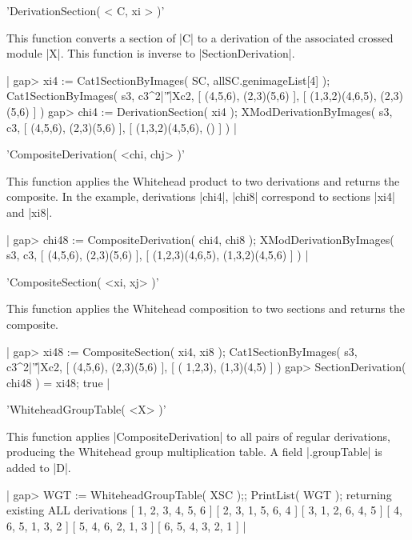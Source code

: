 %

'DerivationSection( < C, xi > )'

This  function  converts a  section   of |C| to   a derivation  of the
associated   crossed  module    |X|.  This function    is   inverse to
|SectionDerivation|.

|    gap> xi4 := Cat1SectionByImages( SC, allSC.genimageList[4] );
    Cat1SectionByImages( s3, c3^2|'\|'|Xc2, [ (4,5,6), (2,3)(5,6) ], 
       [ (1,3,2)(4,6,5), (2,3)(5,6) ] )
    gap> chi4 := DerivationSection( xi4 );
    XModDerivationByImages( s3, c3, [ (4,5,6), (2,3)(5,6) ],
       [ (1,3,2)(4,5,6), () ] )  |

%

'CompositeDerivation( <chi, chj> )'

This function  applies the  Whitehead product  to  two derivations and
returns the  composite.   In the  example,  derivations |chi4|, |chi8|
correspond to sections |xi4| and |xi8|.

|    gap> chi48 := CompositeDerivation( chi4, chi8 );
    XModDerivationByImages( s3, c3, [ (4,5,6), (2,3)(5,6) ], 
       [ (1,2,3)(4,6,5), (1,3,2)(4,5,6) ] )  |

%

'CompositeSection( <xi, xj> )'

This function  applies the Whitehead  composition to  two sections and
returns the composite.

|    gap> xi48 := CompositeSection( xi4, xi8 );
    Cat1SectionByImages( s3, c3^2|'\|'|Xc2, [ (4,5,6), (2,3)(5,6) ], 
       [ ( 1,2,3), (1,3)(4,5) ] )
    gap> SectionDerivation( chi48 ) = xi48;
    true  |

%

'WhiteheadGroupTable( <X> )'

This  function applies |CompositeDerivation|   to all pairs of regular
derivations,  producing the Whitehead  group  multiplication table.  A
field |.groupTable| is added to |D|.

|    gap> WGT := WhiteheadGroupTable( XSC );; PrintList( WGT );
    returning existing ALL derivations
    [ 1, 2, 3, 4, 5, 6 ]
    [ 2, 3, 1, 5, 6, 4 ]
    [ 3, 1, 2, 6, 4, 5 ]
    [ 4, 6, 5, 1, 3, 2 ]
    [ 5, 4, 6, 2, 1, 3 ]
    [ 6, 5, 4, 3, 2, 1 ]  |


